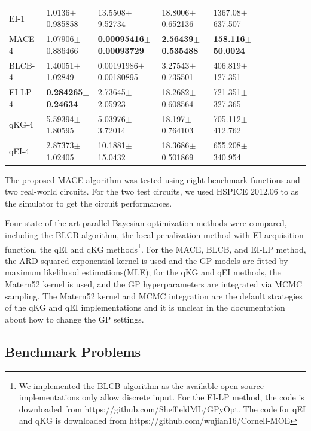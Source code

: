 \begin{table}[t]
\begin{tabular}{lllllllllll}
        EI-1    & 1.0136$\pm$0.985858           &  13.5508$\pm$9.52734                & 18.8006$\pm$0.652136          & 1367.08$\pm$637.507 \\
        MACE-4  & 1.07906$\pm$0.886466          &  \textbf{0.00095416$\pm$0.00093729} & \textbf{2.56439$\pm$0.535488} & \textbf{158.116$\pm$50.0024} \\
        BLCB-4  & 1.40051$\pm$1.02849           &  0.00191986$\pm$0.00180895          & 3.27543$\pm$0.735501          & 406.819$\pm$127.351 \\
        EI-LP-4 & \textbf{0.284265$\pm$0.24634} &  2.73645$\pm$2.05923                & 18.2682$\pm$0.608564          & 721.351$\pm$327.365 \\
        qKG-4   & 5.59394$\pm$1.80595           &  5.03976$\pm$3.72014                & 18.197$\pm$0.764103           & 705.112$\pm$412.762 \\
        qEI-4   & 2.87373$\pm$1.02405           &  10.1881$\pm$15.0432                & 18.3686$\pm$0.501869          & 655.208$\pm$340.954 \\
        \bottomrule
    \end{tabular}
\end{table}

The proposed MACE algorithm was tested using eight benchmark functions and two
real-world circuits. For the two test circuits, we used HSPICE 2012.06 to as
the simulator to get the circuit performances.

Four state-of-the-art parallel Bayesian optimization methods were compared,
including the BLCB algorithm, the local penalization method with EI acquisition
function, the qEI and qKG methods\footnote{We implemented the BLCB algorithm as
the available open source implementations only allow discrete input. For the
EI-LP method, the code is downloaded from
https://github.com/SheffieldML/GPyOpt. The code for qEI and qKG is downloaded
from https://github.com/wujian16/Cornell-MOE}. For the MACE, BLCB, and EI-LP
method, the ARD squared-exponential kernel is used and the GP models are fitted
by maximum likelihood estimations(MLE); for the qKG and qEI methods, the
Matern52 kernel is used, and the GP hyperparameters are integrated via MCMC
sampling. The Matern52 kernel and MCMC integration are the default strategies
of the qKG and qEI implementations and it is unclear in the documentation about
how to change the GP settings.


\subsection{Benchmark Problems}

